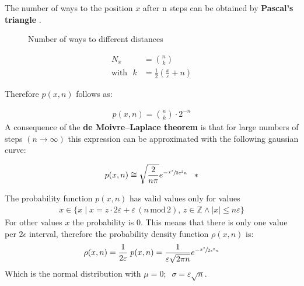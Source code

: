 \documentclass[a4paper, parskip=half]{scrartcl}
\newcommand{\effect}[1]{%
	\textbf{#1}%
}
\newcommand{\myEqLabel}[1]{\label{eq:#1}}
\newcommand{\myEqAnnex}[1]{\;\;\;\ast \myEqLabel{#1}}
\begin{document}
The number of ways to the position $x$ after n steps can be obtained by \effect{Pascal's triangle}.

\begin{figure}[ht!]
\centering
{}
\caption{Number of ways to different distances}
\end{figure}

\begin{align}
N_x &= \binom{n}{k}\\
\mathrm{with} \, \, \,\, k &= \frac{1}{2}\left(\frac{x}{\varepsilon} + n \right)
\end{align}

Therefore $p(x,n)$ follows as:

\begin{align}
p(x,n) = \binom{n}{k} \cdot 2^{-n}
\end{align}
A consequence of the \effect{de Moivre–Laplace theorem} is that for large numbers of steps $(n\rightarrow\infty)$ this expression can be approximated with the following gaussian curve:

\begin{align}
p(x,n) \cong \sqrt{\frac{2}{n \pi}} e^{-\sfrac{x^2}{2\varepsilon^2 n}} \myEqAnnex{moivre_laplace_theorem}
\end{align}

The probability function $p(x,n)$ has valid values only for values 
\begin{align}
x \in \{x\; |\; x = z \cdot 2 \varepsilon + \varepsilon\, (n\,\mathrm{mod}\, 2),\, z \in \mathbb{Z} \wedge |x| \leq n \varepsilon\} 
\end{align}
For other values $x$ the probability is $0$. This means that there is only one value per $2\epsilon$ interval, therefore the probability density function $\rho(x,n)$ is:
\begin{align}
\rho(x,n) = \frac{1}{2\varepsilon}\; p(x,n) = \frac{1}{\varepsilon\sqrt{2\pi n}} e^{-\sfrac{x^2}{2\varepsilon^2 n}}
\end{align}
Which is the normal distribution with $\mu = 0;\;\; \sigma =  \varepsilon\sqrt{n}$.
\end{document}
